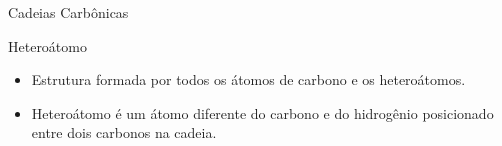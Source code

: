 \documentclass[presentation,professionalfonts,aspectratio=169]{beamer}
\begin{document}
\begin{frame}[label={sec:org3d69f14}]{Cadeias Carbônicas}
\begin{myrule}{Heteroátomo}

\begin{itemize}
\item Estrutura formada por todos os átomos de carbono e os heteroátomos.
\item Heteroátomo é um átomo diferente do carbono e do hidrogênio  posicionado
entre  dois  carbonos  na cadeia.
\end{itemize}


\vspace{.5cm}

\end{myrule}
\end{frame}
\end{document}
